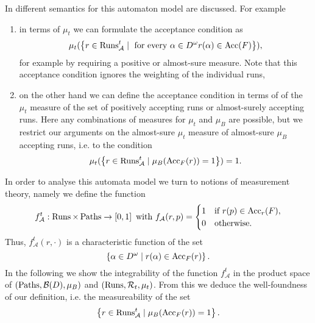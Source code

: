 In \cite{RandAutoInfTrees} different semantics for this automaton model are
discussed. For example
\begin{enumerate}
  \item in terms of $\mu_{t}$ we can formulate the acceptance condition as
    \begin{equation*}
      \mu_{t}(
        \left\{
          r\in\operatorname{Runs}_{\mathcal{A}}^{t}\mid
            \text{ for every }\alpha\in D^{\omega}r(\alpha)\in\operatorname{Acc}(F)
        \right\}
      ),
    \end{equation*}
    for example by requiring a positive or almost-sure measure. Note that this
    acceptance condition ignores the weighting of the individual runs,
  \item on the other hand we can define the acceptance condition in terms of
    of the $\mu_{t}$ measure of the set of positively accepting runs or 
    almost-surely accepting runs. Here any combinations of measures for 
    $\mu_{t}$ and $\mu_{B}$ are possible, but we restrict our arguments on the 
    almost-sure $\mu_{t}$ measure of almost-sure $\mu_{B}$ accepting runs, i.e.
    to the condition
    \begin{equation*}
      \mu_{t}(
        \left\{
          r\in\operatorname{Runs}_{\mathcal{A}}^{t}\mid
            \mu_{B}(\operatorname{Acc}_{F}(r)) = 1
        \right\}
      ) = 1.
    \end{equation*}
\end{enumerate}
In order to analyse this automata model we turn to notions of measurement 
theory, namely we define the function
\begin{equation*}
  f_{\mathcal{A}}^{t}:\operatorname{Runs}\times\operatorname{Paths}\rightarrow\left[0,1\right]
  \text{ with }
  f_{\mathcal{A}}(r, p) = \begin{cases}
    1&\text{if }r(p)\in\operatorname{Acc}_{r}(F),\\
    0&\text{otherwise.}
  \end{cases}
\end{equation*}
Thus, $f_{\mathcal{A}}^{t}(r,\cdot)$ is a characteristic function of the set
\begin{equation*}
  \left\{\alpha\in D^{\omega}\mid r(\alpha)\in\operatorname{Acc}_{F}(r)\right\}.
\end{equation*}
In the following we show the integrability of the function 
$f_{\mathcal{A}}^{t}$ in the product space of 
$\left(\operatorname{Paths}, \mathcal{B}(D), \mu_{B}\right)$ and 
$\left(\operatorname{Runs}, \mathcal{R}_{t}, \mu_{t}\right)$. From this we deduce the 
well-foundness of our definition, i.e. the measureability of the set
\begin{equation*}
  \left\{
    r\in\operatorname{Runs}_{\mathcal{A}}^{t}\mid
      \mu_{B}(\operatorname{Acc}_{F}(r)) = 1
  \right\}.
\end{equation*}
